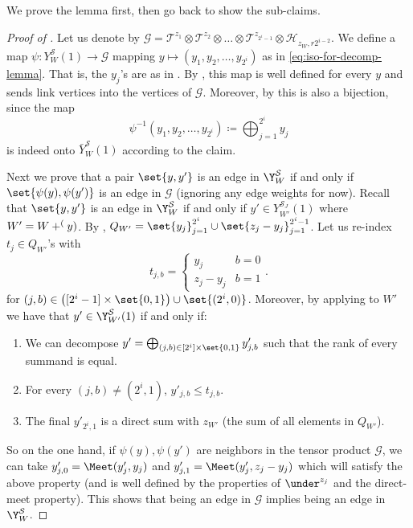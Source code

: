 We prove the lemma first, then go back to show the sub-claims.
\begin{proof}[Proof of ]
    Let us denote by \(\mathcal{G} = \mathcal{T}^{z_1} \otimes \mathcal{T}^{z_2} \otimes \dots \otimes \mathcal{T}^{z_{2^i-1}} \otimes \mathcal{H}_{z_W,r2^{i-2}}\). We define a map \(\psi: Y^{\mathcal{S}}_W(1) \to \mathcal{G}\) mapping \(y \mapsto (y_1,y_2,\dots,y_{2^i})\) as in \eqref{eq:iso-for-decomp-lemma}. That is, the \(y_j\)'s are as in . By , this map is well defined for every \(y\) and sends link vertices into the vertices of \(\mathcal{G}\). Moreover, by  this is also a bijection, since the map \[\psi^{-1}(y_1,y_2,\dots,y_{2^i}) \coloneqq \bigoplus_{j=1}^{2^i} y_j\]
    is indeed onto \(\bar{Y}^{\mathcal{S}}_{W}(1)\) according to the claim.

    Next we prove that a pair \(\set{y,y'}\) is an edge in \(\Y^{\mathcal{S}}_W\) if and only if \(\set{\psi(y),\psi(y')}\) is an edge in \(\mathcal{G}\) (ignoring any edge weights for now). Recall that \(\set{y,y'}\) is an edge in \(\Y^{\mathcal{S}}_W\) if and only if \(y' \in Y^{\mathcal{S}_J}_{W'}(1)\) where \(W'=W+\sp(y)\).
    By , \(Q_{W'} = \set{y_j}_{j=1}^{2^i} \cup \set{z_j - y_j}_{j=1}^{2^i-1}\). 
    Let us re-index \(t_j \in Q_{W'}\)'s with \[t_{j,b} = \begin{cases}
            y_j & b=0 \\ z_j - y_j & b=1
    \end{cases}.\]
    for \((j,b) \in \left ( [2^i - 1] \times \set{0,1} \right ) \cup \set{(2^i,0)}\). 
    Moreover, by applying  to \(W'\) we have that \(y' \in \Y^{\mathcal{S}}_{W'}(1)\) if and only if:
    \begin{enumerate}
        \item We can decompose \(y'=\bigoplus_{(j,b)\in [2^i] \times \set{0,1} }y'_{j,b}\) such that the rank of every summand is equal. 
        \item For every \((j,b) \ne (2^i,1)\), \(y'_{j,b} \leq t_{j,b}\).
        \item The final \(y'_{2^i,1}\) is a direct sum with \(z_{W'}\) (the sum of all elements in \(Q_{W'}\)).
    \end{enumerate}

    So on the one hand, if \(\psi(y),\psi(y')\) are neighbors in the tensor product \(\mathcal{G}\), we can take \(y_{j,0}' = \Meet(y_j',y_j)\) and \(y_{j,1}' = \Meet(y_j',z_j - y_j)\) which will satisfy the above property (and is well defined by the properties of \(\under^{z_j}\) and the direct-meet property). This shows that being an edge in \(\mathcal{G}\) implies being an edge in \(\Y^{\mathcal{S}}_W\). 
    

\end{proof}
